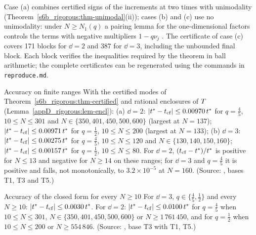 Case (a) combines certified signs of the increments at two times with unimodality
(Theorem~\ref{s6b_rigorous:thm-unimodal}(ii)); cases (b) and (c) use no unimodality: under $N\ge N_1(q)$ a pairing lemma
for the one-dimensional factors controls the terms with negative multipliers $1-q\nu_j$ . The
certificate of case (c) covers 171 blocks for $\dd=2$ and 387 for $\dd=3$, including the unbounded final block. Each block verifies the inequalities required by the theorem in ball arithmetic; the complete certificates can be regenerated using the commands in \texttt{reproduce.md}.

\begin{catheorem}{Accuracy on finite ranges}\label{s6b_rigorous:thm-cffinite}
With the certified modes of Theorem~\ref{s6b_rigorous:thm-certified} and rational enclosures of $T$
(Lemma~\ref{appD_rigorous:lem-encl}):
(a) $\dd=2$: $|t^{*}-t_{\mathrm{cf}}|\le0.00970\,t^{*}$ for $q=\frac45$, $10\le N\le301$ and $N\in\{350,401,450,500,600\}$
(largest at $N=137$); $|t^{*}-t_{\mathrm{cf}}|\le0.00971\,t^{*}$ for $q=\frac12$, $10\le N\le200$ (largest at $N=133$);
(b) $\dd=3$: $|t^{*}-t_{\mathrm{cf}}|\le0.00275\,t^{*}$ for $q=\frac45$, $10\le N\le120$ and $N\in\{130,140,150,160\}$;
$|t^{*}-t_{\mathrm{cf}}|\le0.00157\,t^{*}$ for $q=\frac12$, $10\le N\le80$.
For $\dd=2$, $(t_{\mathrm{cf}}-t^{*})/t^{*}$ is positive for $N\le13$ and negative for $N\ge14$ on these ranges; for $\dd=3$ and
$q=\frac45$ it is positive and falls, not monotonically, to $3.2\times10^{-5}$ at $N=160$.
\textup{(Source: , bases T1, T3 and T5.)}
\end{catheorem}

\begin{cacorollary}{Accuracy of the closed form for every $N\ge10$}\label{s6b_rigorous:cor-cf}
 For $\dd=3$, $q\in\{\frac45,\frac12\}$ and every $N\ge10$: $|t^{*}-t_{\mathrm{cf}}|\le0.0030\,t^{*}$. For $\dd=2$:
$|t^{*}-t_{\mathrm{cf}}|\le0.0100\,t^{*}$ for $q=\frac45$ when $10\le N\le301$, $N\in\{350,401,450,500,600\}$ or
$N\ge1\,761\,450$, and for $q=\frac12$ when $10\le N\le200$ or $N\ge554\,846$.
\textup{(Source: , base T3 with T1, T5.)}
\end{cacorollary}

